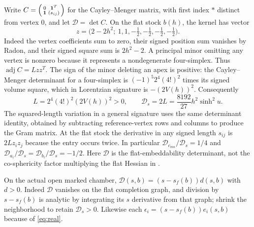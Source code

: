 \documentclass[11pt]{article}
\newcommand{\calD}{\mathcal D}
\begin{document}
Write \(C=\begin{psmallmatrix}0&\boldsymbol 1^T\\ \boldsymbol 1&(s_{ij})\end{psmallmatrix}\) for the Cayley--Menger matrix, with first index \(*\) distinct from vertex 0, and let \(\calD=\det C\). On the flat stock \(b(h)\), the kernel has vector
\[
 z=\big(2-2h^2;\ 1,1,-\tfrac12,-\tfrac12,-\tfrac12,-\tfrac12\big).
\]
Indeed the vertex coefficients sum to zero, their signed position sum vanishes by Radon, and their signed square sum is \(2h^2-2\). A principal minor omitting any vertex is nonzero because it represents a nondegenerate four-simplex. Thus \(\operatorname{adj}C=Lzz^T\). The sign of the minor deleting an apex is positive: the Cayley--Menger determinant for a four-simplex is \((-1)^5 2^4 (4!)^2\) times its signed volume square, which in Lorentzian signature is \(-(2V(h))^2\). Consequently
\[
 L=2^4(4!)^2(2V(h))^2>0,\qquad
 \calD_s=2L=\frac{8192}{27}h^2\sinh^2u.
\]
The squared-length variation in a general signature uses the same determinant identity, obtained by subtracting reference-vertex rows and columns to produce the Gram matrix. At the flat stock the derivative in any signed length \(s_{ij}\) is \(2L z_i z_j\) because the entry occurs twice. In particular \(\calD_{c_{mn}}/\calD_s=1/4\) and \(\calD_{a_i}/\calD_s=\calD_{b_i}/\calD_s=-1/2\). Here \(\calD\) is the flat-embeddability determinant, not the co-sphericity factor multiplying the flat Hessian in \cite{BD,DKS}.

On the actual open marked chamber, \(\calD(s,b)=(s-s_f(b))d(s,b)\) with \(d>0\). Indeed \(\calD\) vanishes on the flat completion graph, and division by \(s-s_f(b)\) is analytic by integrating its \(s\) derivative from that graph; shrink the neighborhood to retain \(\calD_s>0\). Likewise each \(\epsilon_i=(s-s_f(b))e_i(s,b)\) because of \eqref{eq:real}.
\end{document}
